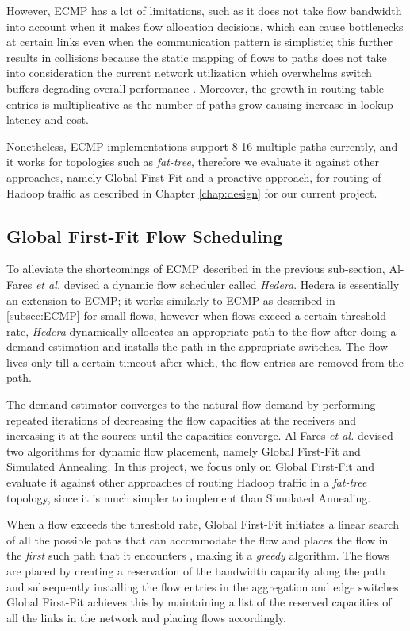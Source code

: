 However, ECMP has a lot of limitations, such as it does not take flow bandwidth into account when it makes flow allocation decisions, which can cause bottlenecks at certain links even when the communication pattern is simplistic; this further results in collisions because the static mapping of flows to paths does not take into consideration the current network utilization which overwhelms switch buffers degrading overall performance \cite{al2010hedera}. Moreover, the growth in routing table entries is multiplicative as the number of paths grow causing increase in lookup latency and cost.    

Nonetheless, ECMP implementations support 8-16 multiple paths currently, and it works for topologies such as \textit{fat-tree}, therefore we evaluate it against other approaches, namely Global First-Fit and a proactive approach, for routing of Hadoop traffic as described in Chapter \ref{chap:design} for our current project.

\subsection{Global First-Fit Flow Scheduling} \label{subsec:Hedera}

To alleviate the shortcomings of ECMP described in the previous sub-section, Al-Fares \textit{et al.} \cite{al2010hedera} devised a dynamic flow scheduler called \textit{Hedera}. Hedera is essentially an extension to ECMP; it works similarly to ECMP as described in \ref{subsec:ECMP} for small flows, however when flows exceed a certain threshold rate, \textit{Hedera} dynamically allocates an appropriate path to the flow after doing a demand estimation and installs the path in the appropriate switches. The flow lives only till a certain timeout after which, the flow entries are removed from the path.

The demand estimator converges to the natural flow demand by performing repeated iterations of decreasing the flow capacities at the receivers and increasing it at the sources until the capacities converge. Al-Fares \textit{et al.} devised two algorithms for dynamic flow placement, namely Global First-Fit and Simulated Annealing. In this project, we focus only on Global First-Fit and evaluate it against other approaches of routing Hadoop traffic in a \textit{fat-tree} topology, since it is much simpler to implement than Simulated Annealing.    

When a flow exceeds the threshold rate, Global First-Fit initiates a linear search of all the possible paths that can accommodate the flow and places the flow in the \textit{first} such path that it encounters \cite{al2010hedera}, making it a \textit{greedy}  algorithm. The flows are placed by creating a reservation of the bandwidth capacity along the path and subsequently installing the flow entries in the aggregation and edge switches. Global First-Fit achieves this by maintaining a list of the reserved capacities of all the links in the network and placing flows accordingly.

